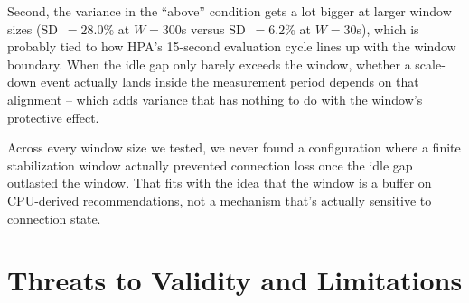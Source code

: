\documentclass[twocolumn]{svjour3}
\begin{document}
Second, the variance in the ``above'' condition gets a lot bigger at larger window
sizes (SD~$= 28.0\%$ at $W=300$s versus SD~$= 6.2\%$ at $W=30$s), which is probably
tied to how HPA's 15-second evaluation cycle lines up with the window boundary.
When the idle gap only barely exceeds the window, whether a scale-down event
actually lands inside the measurement period depends on that alignment -- which
adds variance that has nothing to do with the window's protective effect.

Across every window size we tested, we never found a configuration where a finite
stabilization window actually prevented connection loss once the idle gap outlasted
the window. That fits with the idea that the window is a buffer on CPU-derived
recommendations, not a mechanism that's actually sensitive to connection state.

\section{Threats to Validity and Limitations}
\label{sec:limitations}
\end{document}
